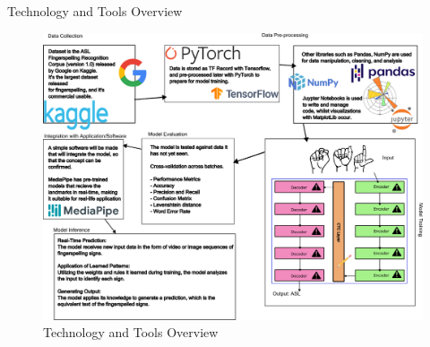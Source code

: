 \documentclass{beamer} %
\begin{document}
\begin{frame}[t]
\begin{columns}[t]
		\begin{column}{0.3\textwidth} %


			\begin{block}{Technology and Tools Overview}
				\begin{figure}
					\includegraphics[width=\linewidth]{drawing.png}
					\caption{Technology and Tools Overview}
				\end{figure}
			\end{block}



\end{column}
\end{columns}
\end{frame}
\end{document}
